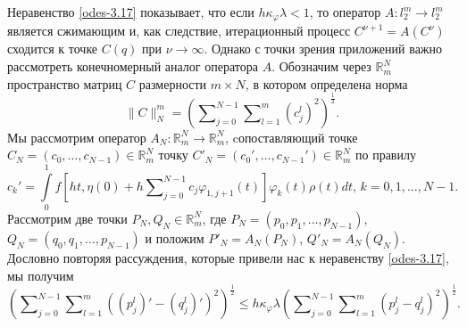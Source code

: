 Неравенство \eqref{odes-3.17} показывает, что если $h\kappa_\varphi\lambda<1$, то оператор  $A:l_2^m\to l_2^m$ является сжимающим и, как следствие, итерационный процесс $C^{\nu+1}=A(C^{\nu})$  сходится к точке $C(q)$ при $\nu\to\infty$. Однако с точки зрения приложений важно рассмотреть конечномерный аналог оператора $A$. Обозначим через $\mathbb{R}^N_m$ пространство матриц $C$ размерности $m\times N$, в котором определена норма
$$\|C\|_N^m=\left(\sum\nolimits_{j=0}^{N-1} \sum\nolimits_{l=1}^{m}(c_j^l)^2\right)^\frac12.$$
 Мы рассмотрим оператор $A_N:\mathbb{R}^N_m\to \mathbb{R}^N_m$, cопоставляющий точке\\
$C_N=(c_0,\ldots,c_{N-1})\in \mathbb{R}^N_m $ точку  $C'_N=(c_0',\ldots,c_{N-1}')\in \mathbb{R}^N_m $ по правилу
\begin{equation}\label{odes-3.18}
c_k'=\int\limits_{0}^1f\left[ht,\eta(0)+ h\sum\nolimits_{j=0}^{N-1} c_j\varphi_{1,j+1}(t)\right]\varphi_k(t)\rho(t) dt,\,k=0,1,\ldots, N-1.
\end{equation}
 Рассмотрим две точки $P_N,Q_N\in \mathbb{R}^N_m$, где $P_N=(p_0,p_1,\ldots,p_{N-1})$,\\   $Q_N=(q_0,q_1,\ldots,p_{N-1})$ и положим $P'_N=A_N(P_N)$, $Q'_N=A_N(Q_N)$. Дословно повторяя рассуждения, которые привели нас к неравенству \eqref{odes-3.17}, мы получим
\begin{equation}\label{odes-3.19}
\left(\sum\nolimits_{j=0}^{N-1}\sum\nolimits_{l=1}^m((p^l_j)'-(q^l_j)')^2\right)^\frac12\le h\kappa_\varphi\lambda \left(\sum\nolimits_{j=0}^{N-1}\sum\nolimits_{l=1}^m( p^l_j-q^l_j)^2\right)^\frac12.
\end{equation}

